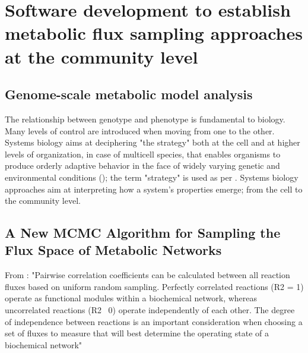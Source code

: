 % 
% 

\chapter{Software development to establish metabolic flux sampling 
         approaches at the community level}
\label{cha:dingo}


\section{Genome-scale metabolic model analysis}

The relationship between genotype and phenotype is fundamental to biology.
Many levels of control are introduced when moving from one to the other. 
Systems biology aims at deciphering "the strategy" both at the cell and at higher levels of organization, in case of multicell species, that enables organisms to produce orderly adaptive behavior in the face of widely varying genetic and environmental conditions (\cite{strohman2002maneuvering}); the term "strategy" is used as per \cite{polanyi1968life}.
Systems biology approaches aim at interpreting how a system's properties emerge; from the cell to the community level.


\section{A New MCMC Algorithm for Sampling the Flux Space of Metabolic Networks}


\cite{chalki2021SoCG}


From \citet{price2004genome} :
"Pairwise correlation coefficients can be calculated
between all reaction fluxes based on uniform random
sampling. Perfectly correlated reactions (R2 = 1) operate
as functional modules within a biochemical network,
whereas uncorrelated reactions (R2 ~0) operate independently of each other. The degree of independence
between reactions is an important consideration when
choosing a set of fluxes to measure that will best determine the operating state of a biochemical network"


